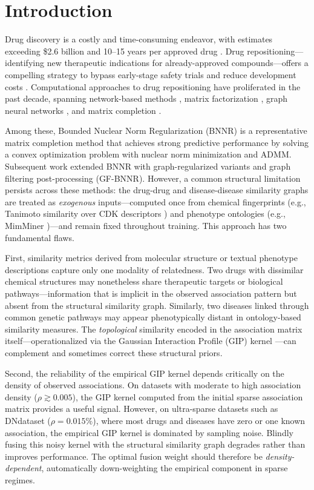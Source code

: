 \documentclass{oup-authoring-template}
\begin{document}
\section{Introduction}

Drug discovery is a costly and time-consuming endeavor, with estimates exceeding \$2.6 billion and 10--15 years per approved drug \cite{dimasi2003,paul2010}. Drug repositioning---identifying new therapeutic indications for already-approved compounds---offers a compelling strategy to bypass early-stage safety trials and reduce development costs \cite{chong2007}. Computational approaches to drug repositioning have proliferated in the past decade, spanning network-based methods \cite{martinez2015,luo2016}, matrix factorization \cite{dai2015,ezzat2017,zheng2013}, graph neural networks \cite{fu2022,gao2023}, and matrix completion \cite{yang2019,luo2018,mongia2022}.

Among these, Bounded Nuclear Norm Regularization (BNNR) \cite{yang2019} is a representative matrix completion method that achieves strong predictive performance by solving a convex optimization problem with nuclear norm minimization and ADMM. Subsequent work extended BNNR with graph-regularized variants \cite{mongia2022,liu2025tarm} and graph filtering post-processing (GF-BNNR). However, a common structural limitation persists across these methods: the drug-drug and disease-disease similarity graphs are treated as \emph{exogenous} inputs---computed once from chemical fingerprints (e.g., Tanimoto similarity over CDK descriptors \cite{steinbeck2003}) and phenotype ontologies (e.g., MimMiner \cite{vandriel2006})---and remain fixed throughout training. This approach has two fundamental flaws.

First, similarity metrics derived from molecular structure or textual phenotype descriptions capture only one modality of relatedness. Two drugs with dissimilar chemical structures may nonetheless share therapeutic targets or biological pathways---information that is implicit in the observed association pattern but absent from the structural similarity graph. Similarly, two diseases linked through common genetic pathways may appear phenotypically distant in ontology-based similarity measures. The \emph{topological} similarity encoded in the association matrix itself---operationalized via the Gaussian Interaction Profile (GIP) kernel \cite{vanlaarhoven2011}---can complement and sometimes correct these structural priors.

Second, the reliability of the empirical GIP kernel depends critically on the density of observed associations. On datasets with moderate to high association density ($\rho \gtrsim 0.005$), the GIP kernel computed from the initial sparse association matrix provides a useful signal. However, on ultra-sparse datasets such as DNdataset ($\rho = 0.015\%$), where most drugs and diseases have zero or one known association, the empirical GIP kernel is dominated by sampling noise. Blindly fusing this noisy kernel with the structural similarity graph degrades rather than improves performance. The optimal fusion weight should therefore be \emph{density-dependent}, automatically down-weighting the empirical component in sparse regimes.
\end{document}
